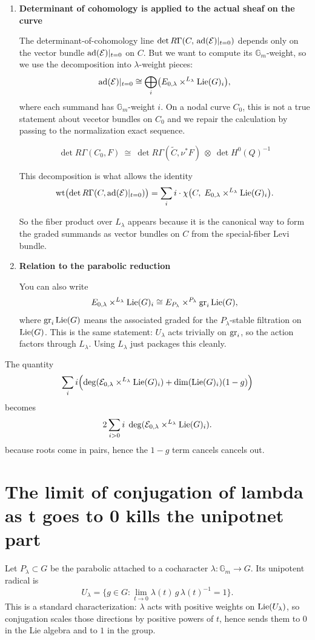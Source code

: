 \documentclass[12pt]{article}
\begin{document}
\begin{enumerate}
    \item \textbf{Determinant of cohomology is applied to the actual sheaf on the curve}
    
    The determinant-of-cohomology line $\det R\Gamma(C,\,\operatorname{ad}(\mathcal{E})|_{t=0})$ depends only on the vector bundle $\operatorname{ad}(\mathcal{E})|_{t=0}$ on $C$. But we want to compute its $\mathbb{G}_m$-weight, so we use the decomposition into $\lambda$-weight pieces:
    \[
    \operatorname{ad}(\mathcal{E})|_{t=0}
    \cong \bigoplus_i \bigl(E_{0,\lambda}\times^{L_\lambda}\operatorname{Lie}(G)_i\bigr),
    \]
    where each summand has $\mathbb{G}_m$-weight $i$. On a nodal curve $C_0$, this is not a true statement about vecetor bundles on $C_0$ and we repair the calculation by passing to the normalization exact sequence.

    \[\det R\Gamma(C_0,F)\ \cong\ \det R\Gamma(\widetilde C,\nu^*F)\ \otimes\ \det H^0(Q)^{-1}\]
    
    This decomposition is what allows the identity
    \[
    \mathrm{wt}\bigl(\det R\Gamma(C,\operatorname{ad}(\mathcal{E})|_{t=0})\bigr)
    =\sum_i i\cdot \chi\bigl(C,\;E_{0,\lambda}\times^{L_\lambda}\operatorname{Lie}(G)_i\bigr).
    \]
    
    So the fiber product over $L_\lambda$ appears because it is the canonical way to form the graded summands as vector bundles on $C$ from the special-fiber Levi bundle.
    
    \item \textbf{Relation to the parabolic reduction}
    
    You can also write
    \[
    E_{0,\lambda}\times^{L_\lambda}\operatorname{Lie}(G)_i
    \cong
    E_{P_\lambda}\times^{P_\lambda} \operatorname{gr}_i\operatorname{Lie}(G),
    \]
    where $\operatorname{gr}_i\operatorname{Lie}(G)$ means the associated graded for the $P_\lambda$-stable filtration on $\operatorname{Lie}(G)$. This is the same statement: $U_\lambda$ acts trivially on $\operatorname{gr}_i$, so the action factors through $L_\lambda$. Using $L_\lambda$ just packages this cleanly.
\end{enumerate}
The quantity 
\[
\sum_i i\Bigl(\deg(\mathcal E_{0,\lambda}\times^{L_\lambda}\operatorname{Lie}(G)_i)
+\dim(\operatorname{Lie}(G)_i)(1-g)\Bigr)
\] becomes \[
2\sum_{i>0} i\;\deg(\mathcal E_{0,\lambda}\times^{L_\lambda}\operatorname{Lie}(G)_i).
\] because roots come in pairs, hence the $1-g$ term cancels cancels out.

\section{The limit of conjugation of lambda as t goes to 0 kills the unipotnet part}
Let $P_\lambda \subset G$ be the parabolic attached to a cocharacter $\lambda : \mathbb{G}_m \to G$. Its unipotent radical is
\[
U_\lambda = \{g \in G : \lim_{t \to 0} \lambda(t) \, g \, \lambda(t)^{-1} = 1\}.
\]
This is a standard characterization: $\lambda$ acts with positive weights on $\operatorname{Lie}(U_\lambda)$, so conjugation scales those directions by positive powers of $t$, hence sends them to $0$ in the Lie algebra and to $1$ in the group.
\end{document}
